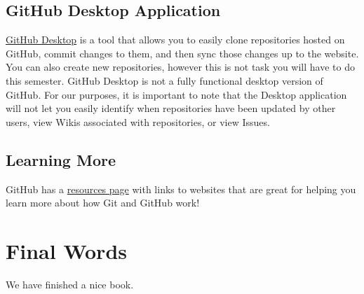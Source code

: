 \documentclass[]{book}
\begin{document}
\section{GitHub Desktop Application}\label{github-desktop-application}

\href{https://desktop.github.com}{GitHub Desktop} is a tool that allows
you to easily clone repositories hosted on GitHub, commit changes to
them, and then sync those changes up to the website. You can also create
new repositories, however this is not task you will have to do this
semester. GitHub Desktop is not a fully functional desktop version of
GitHub. For our purposes, it is important to note that the Desktop
application will not let you easily identify when repositories have been
updated by other users, view Wikis associated with repositories, or view
Issues.

\section{Learning More}\label{learning-more}

GitHub has a
\href{https://help.github.com/articles/good-resources-for-learning-git-and-github/}{resources
page} with links to websites that are great for helping you learn more
about how Git and GitHub work!

\chapter{Final Words}\label{final-words}

We have finished a nice book.


\end{document}
